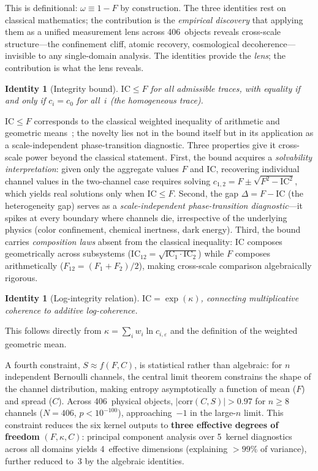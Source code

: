 \documentclass[11pt]{article}
\newcommand{\eps}{\varepsilon}
\newcommand{\IC}{\mathrm{IC}}
\newtheorem{identity}[theorem]{Identity}
\begin{document}
This is definitional: $\omega \equiv 1 - F$ by construction.
The three identities rest on classical mathematics;
the contribution is the \emph{empirical discovery} that applying them
as a unified measurement lens across 406~objects reveals
cross-scale structure---the confinement cliff, atomic recovery,
cosmological decoherence---invisible to any single-domain analysis.
The identities provide the \emph{lens}; the contribution is what
the lens reveals.

\begin{identity}[Integrity bound]
\label{id:bound}
$\IC \leq F$ for all admissible traces, with equality if and only if
$c_i = c_0$ for all~$i$ (the homogeneous trace).
\end{identity}

$\IC \leq F$ corresponds to the classical weighted inequality of
arithmetic and geometric means~\cite{hardylittlewoodpolya1952};
the novelty lies not in the bound itself but in its application as a
scale-independent phase-transition diagnostic.
Three properties give it cross-scale power beyond the classical
statement. First, the bound acquires a \emph{solvability
interpretation}: given only the aggregate values $F$ and $\IC$,
recovering individual channel values in the two-channel case
requires solving $c_{1,2} = F \pm \sqrt{F^2 - \IC^2}$, which
yields real solutions only when $\IC \leq F$. Second, the gap $\Delta = F - \IC$
(the heterogeneity gap) serves as a \emph{scale-independent
phase-transition diagnostic}---it spikes at every boundary where
channels die, irrespective of the underlying physics
(color confinement, chemical inertness, dark energy).
Third, the bound carries \emph{composition laws} absent
from the classical inequality: $\IC$ composes geometrically across
subsystems ($\IC_{12} = \sqrt{\IC_1 \cdot \IC_2}$) while $F$
composes arithmetically ($F_{12} = (F_1 + F_2)/2$), making
cross-scale comparison algebraically rigorous.

\begin{identity}[Log-integrity relation]
\label{id:logint}
$\IC = \exp(\kappa)$, connecting multiplicative coherence to
additive log-coherence.
\end{identity}

This follows directly from $\kappa = \sum_i w_i \ln c_{i,\eps}$ and
the definition of the weighted geometric mean.

A fourth constraint, $S \approx f(F, C)$, is statistical rather than
algebraic: for $n$ independent Bernoulli channels, the central limit
theorem constrains the shape of the channel distribution, making
entropy asymptotically a function of mean ($F$) and spread ($C$).
Across 406~physical objects,
$|\mathrm{corr}(C, S)| > 0.97$ for $n \geq 8$ channels
($N = 406$, $p < 10^{-100}$), approaching~$-1$ in the
large-$n$ limit. This
constraint reduces the six kernel outputs to \textbf{three effective
degrees of freedom} $(F, \kappa, C)$: principal component analysis
over 5~kernel diagnostics across all domains yields 4~effective
dimensions (explaining $> 99\%$ of variance), further reduced to~3
by the algebraic identities.
\end{document}
